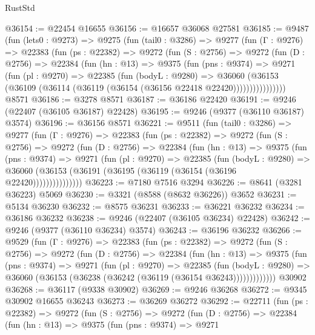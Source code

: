 \begin{lexlean}{RustStd}
\begin{coremodule}
@36154 := @22454 @16655
@36156 := @16657 @36068 @27581
@36185 := @9487
    (fun (lets0 : @9273) =>
    @9275
      (fun (tail0 : @3286) =>
      @9277
        (fun (Γ : @9276) =>
        @22383
          (fun (ps : @22382) =>
          @9272
            (fun (S : @2756) =>
            @9272
              (fun (D : @2756) =>
              @22384
                (fun (hn : @13) =>
                @9375
                  (fun (pns : @9374) =>
                  @9271
                    (fun (pl : @9270) =>
                    @22385
                      (fun (bodyL : @9280) =>
                      @36060
                        (@36153
                          (@36109 (@36114 (@36119 (@36154 (@36156 @22418 @22420))))))))))))))))
    @8571
@36186 := @3278 @8571
@36187 := @36186 @22420
@36191 := @9246 (@22407 (@36105 @36187) @22428)
@36195 := @9246 (@9377 (@36110 @36187) @3574)
@36196 := @36156 @8571
@36221 := @9511
    (fun (tail0 : @3286) =>
    @9277
      (fun (Γ : @9276) =>
      @22383
        (fun (ps : @22382) =>
        @9272
          (fun (S : @2756) =>
          @9272
            (fun (D : @2756) =>
            @22384
              (fun (hn : @13) =>
              @9375
                (fun (pns : @9374) =>
                @9271
                  (fun (pl : @9270) =>
                  @22385
                    (fun (bodyL : @9280) =>
                    @36060 (@36153 (@36191 (@36195 (@36119 (@36154 (@36196 @22420)))))))))))))))
@36223 := @7180 @7516 @3294
@36226 := @8641 (@3281 @36223) @5069
@36230 := @3321 (@8588 (@8632 @36226)) @3652
@36231 := @5134 @36230
@36232 := @8575 @36231
@36233 := @36221 @36232
@36234 := @36186 @36232
@36238 := @9246 (@22407 (@36105 @36234) @22428)
@36242 := @9246 (@9377 (@36110 @36234) @3574)
@36243 := @36196 @36232
@36266 := @9529
    (fun (Γ : @9276) =>
    @22383
      (fun (ps : @22382) =>
      @9272
        (fun (S : @2756) =>
        @9272
          (fun (D : @2756) =>
          @22384
            (fun (hn : @13) =>
            @9375
              (fun (pns : @9374) =>
              @9271
                (fun (pl : @9270) =>
                @22385
                  (fun (bodyL : @9280) =>
                  @36060 (@36153 (@36238 (@36242 (@36119 (@36154 @36243)))))))))))))
    @30902
@36268 := @36117 (@9338 @30902)
@36269 := @9246 @36268
@36272 := @9345 @30902 @16655 @36243
@36273 := @36269 @36272
@36292 := @22711
    (fun (ps : @22382) =>
    @9272
      (fun (S : @2756) =>
      @9272
        (fun (D : @2756) =>
        @22384
          (fun (hn : @13) =>
          @9375
            (fun (pns : @9374) =>
            @9271

\end{coremodule}
\end{lexlean}
